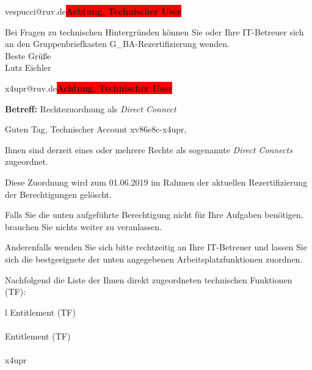 \documentclass[a4paper,landscape,12pt]{letter}
\begin{document}
\begin{letter}{vespucci@ruv.de\space\space\space\space\space\space\space\space\space\bfseries\colorbox{red}{Achtung, Technischer User}\hfill \break}
\begin{minipage}{\textwidth}
			Bei Fragen zu technischen Hintergründen können Sie 
			oder Ihre IT-Betreuer sich an den Gruppenbriefkasten 
			G\_BA-Rezertifizierung
			wenden.\\
			\linebreak
			Beste Grüße\\
			Lutz Eichler
	\end{minipage}
	\end{letter}
	
\begin{letter}{x4upr@ruv.de\space\space\space\space\space\space\space\space\space\bfseries\colorbox{red}{Achtung, Technischer User}\hfill \break}
\begin{normalsize}
	\opening{\textbf{Betreff:} Rechtezuordnung als \emph{Direct Connect}}
	\begin{normalsize} \hfill
	\end{normalsize}

	\begin{normalsize}
		Guten Tag, 
	Technischer Account xv86e8c-x4upr, \hfill \break
	\end{normalsize}
	\end{normalsize}
	
\begin{normalsize}
	Ihnen sind derzeit eines oder mehrere Rechte als sogenannte \emph{Direct Connects} zugeordnet.
	
	Diese Zuordnung wird zum 01.06.2019 im Rahmen der aktuellen Rezertifizierung der Berechtigungen gelöscht.
	
	Falls Sie die unten aufgeführte Berechtigung nicht für Ihre Aufgaben benötigen, 
	brauchen Sie nichts weiter zu veranlassen.
	
	Anderenfalls wenden Sie sich bitte rechtzeitig an Ihre IT-Betreuer 
	und lassen Sie sich die bestgeeignete der unten angegebenen Arbeitsplatzfunktionen zuordnen.
	\end{normalsize}
	
\begin{normalsize}
	Nachfolgend die Liste der Ihnen direkt zugeordneten technischen Funktionen (TF):

	\begin{longtable}{l}
		Entitlement (TF) \\ \hline
		\endfirsthead
		\\\hline
		Entitlement (TF) \\ \hline
		\endhead %
		\multicolumn{1}{r@{}}{Fortsetzung \ldots}\\
		\endfoot
		\hline
		\endlastfoot
	x4upr\\
	\end{longtable}
	\end{normalsize}
	

\end{letter}
\end{document}

